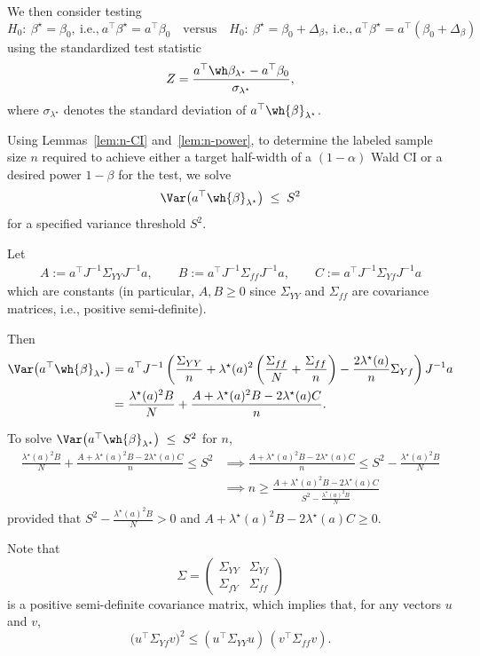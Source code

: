 \noindent
We then consider testing
\[
H_0:\ \beta^\star=\beta_0,\ \text{i.e.,}\ a^\top\beta^\star=a^\top\beta_0
\quad\text{versus}\quad
H_0:\ \beta^\star=\beta_0+\Delta_\beta,\ \text{i.e.,}\ a^\top\beta^\star=a^\top(\beta_0+\Delta_\beta)
\]
using the standardized test statistic
\[
Z=\frac{a^\top\wh\beta_{\lambda^\star}-a^\top\beta_0}{
\sigma_{\lambda^\star}},\]where $\sigma_{\lambda^\star}$ denotes the standard deviation of $a^\top\wh{\beta}_{\lambda^\star}$.

\noindent
Using Lemmas~\ref{lem:n-CI} and~\ref{lem:n-power}, to determine the labeled sample size $n$ required to achieve either a target half-width of a $(1-\alpha)$ Wald CI or a desired power $1-\beta$ for the test, we solve
\[
\Var\!\left(a^\top \wh{\beta}_{\lambda^\star}\right) \;\le\; S^2
\]for a specified variance threshold $S^2$.

\noindent
Let\begin{align*}
A:=a^\top J^{-1}\Sigma_{YY}J^{-1}a,\qquad
B:=a^\top J^{-1}\Sigma_{ff}J^{-1}a,\qquad
C:=a^\top J^{-1}\Sigma_{Yf}J^{-1}a
\end{align*}which are constants (in particular, $A,B\ge0$ since $\Sigma_{YY}$ and $\Sigma_{ff}$ are covariance matrices, i.e., positive semi-definite).

\noindent
Then\begin{align*}
    \Var\!\left(a^\top \wh{\beta}_{\lambda^\star}\right)
    &=a^\top J^{-1}\left(\frac{\Sigma_{YY}}{n}+\lambda^\star(a)^2\left(\frac{\Sigma_{ff}}{N}+\frac{\Sigma_{ff}}{n}\right)-\frac{2\lambda^\star(a)}{n}\Sigma_{Yf}\right)J^{-1}a\\
    &=\frac{\lambda^\star(a)^2  B}{N}+\frac{A+\lambda^\star(a)^2  B-2\lambda^\star(a)  C}{n}.
\end{align*}

\noindent
To solve $\Var\!\left(a^\top \wh{\beta}_{\lambda^\star}\right) \;\le\; S^2$ for $n$,\begin{align*}
    \frac{\lambda^\star(a)^2  B}{N}
    +\frac{A+\lambda^\star(a)^2  B-2\lambda^\star(a)  C}{n}\leq S^2&\implies
    \frac{A+\lambda^\star(a)^2  B-2\lambda^\star(a)  C}{n}\leq S^2-\frac{\lambda^\star(a)^2  B}{N}\\
    &\implies n\geq \frac{A+\lambda^\star(a)^2  B-2\lambda^\star(a) C}{S^2-\frac{\lambda^\star(a)^2  B}{N}}
\end{align*}provided that $S^2-\frac{\lambda^\star(a)^2  B}{N}>0$ and $A+\lambda^\star(a)^2  B-2\lambda^\star(a)  C\ge0$.

\noindent
Note that \[
\Sigma =
\begin{pmatrix}
\Sigma_{YY} & \Sigma_{Yf} \\
\Sigma_{fY} & \Sigma_{ff}
\end{pmatrix}
\]is a positive semi-definite covariance matrix, which implies that, for any vectors $u$ and $v$,\[
\big(u^\top \Sigma_{Yf} v\big)^2
\le
(u^\top \Sigma_{YY} u)\,(v^\top \Sigma_{ff} v).
\]

